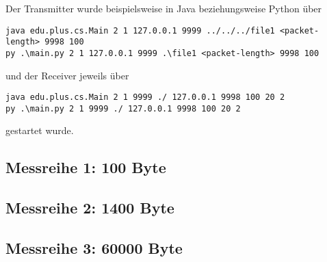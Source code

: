\documentclass{article}
\begin{document}
    Der Transmitter wurde beispielsweise in Java beziehungsweise Python über
    \begin{lstlisting}
java edu.plus.cs.Main 2 1 127.0.0.1 9999 ../../../file1 <packet-length> 9998 100
py .\main.py 2 1 127.0.0.1 9999 .\file1 <packet-length> 9998 100
    \end{lstlisting}und der Receiver jeweils über
    \begin{lstlisting}
java edu.plus.cs.Main 2 1 9999 ./ 127.0.0.1 9998 100 20 2
py .\main.py 2 1 9999 ./ 127.0.0.1 9998 100 20 2
    \end{lstlisting}
    gestartet wurde.

    \subsection{Messreihe 1: 100 Byte}


    \subsection{Messreihe 2: 1400 Byte}


    \subsection{Messreihe 3: 60000 Byte}
\end{document}
